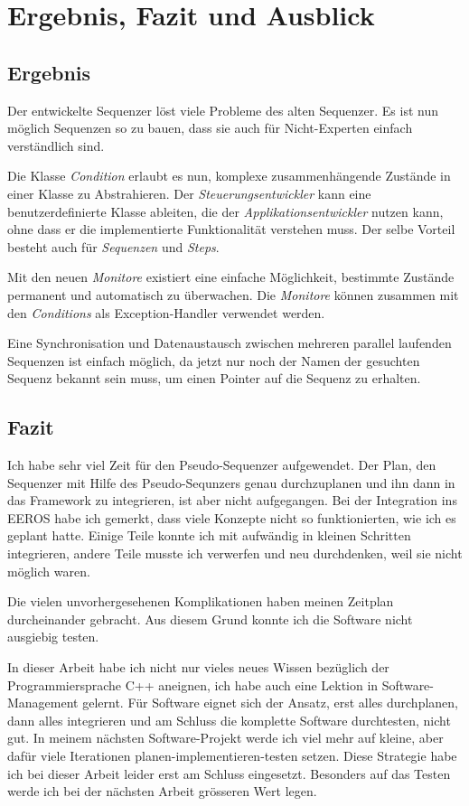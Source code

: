 \chapter{Ergebnis, Fazit und Ausblick}
\section{Ergebnis}
Der entwickelte Sequenzer löst viele Probleme des alten Sequenzer.
Es ist nun möglich Sequenzen so zu bauen, dass sie auch für Nicht-Experten einfach verständlich sind.

Die Klasse \textit{Condition} erlaubt es nun, komplexe zusammenhängende Zustände in einer Klasse zu Abstrahieren.
Der \textit{Steuerungsentwickler} kann eine benutzerdefinierte Klasse ableiten, die der \textit{Applikationsentwickler} nutzen kann, ohne dass er die implementierte Funktionalität verstehen muss.
Der selbe Vorteil besteht auch für \textit{Sequenzen} und \textit{Steps}.

Mit den neuen \textit{Monitore} existiert eine einfache Möglichkeit, bestimmte Zustände permanent und automatisch zu überwachen.
Die \textit{Monitore} können zusammen mit den \textit{Conditions} als Exception-Handler verwendet werden.

Eine Synchronisation und Datenaustausch zwischen mehreren parallel laufenden Sequenzen ist einfach möglich, da jetzt nur noch der Namen der gesuchten Sequenz bekannt sein muss, um einen Pointer auf die Sequenz zu erhalten.


\section{Fazit}	%
Ich habe sehr viel Zeit für den Pseudo-Sequenzer aufgewendet.
Der Plan, den Sequenzer mit Hilfe des Pseudo-Sequnzers genau durchzuplanen und ihn dann in das Framework zu integrieren, ist aber nicht aufgegangen.
Bei der Integration ins EEROS habe ich gemerkt, dass viele Konzepte nicht so funktionierten, wie ich es geplant hatte.
Einige Teile konnte ich mit aufwändig in kleinen Schritten integrieren, andere Teile musste ich verwerfen und neu durchdenken, weil sie nicht möglich waren.

Die vielen unvorhergesehenen Komplikationen haben meinen Zeitplan durcheinander gebracht.
Aus diesem Grund konnte ich die Software nicht ausgiebig testen.

In dieser Arbeit habe ich nicht nur vieles neues Wissen bezüglich der Programmiersprache C++ aneignen, ich habe auch eine Lektion in Software-Management gelernt.
Für Software eignet sich der Ansatz, erst alles durchplanen, dann alles integrieren und am Schluss die komplette Software durchtesten, nicht gut.
In meinem nächsten Software-Projekt werde ich viel mehr auf kleine, aber dafür viele Iterationen planen-implementieren-testen setzen.
Diese Strategie habe ich bei dieser Arbeit leider erst am Schluss eingesetzt.
Besonders auf das Testen werde ich bei der nächsten Arbeit grösseren Wert legen.


